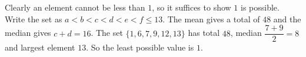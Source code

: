 Clearly an element cannot be less than $1$, so it suffices to show $1$ is possible. Write the set as $a<b<c<d<e<f\le13$. The mean gives a total of $48$ and the median gives $c+d=16$. The set $\{1,6,7,9,12,13\}$ has total $48$, median $\dfrac{7+9}{2}=8$ and largest element $13$. So the least possible value is $\boxed{1}$.
